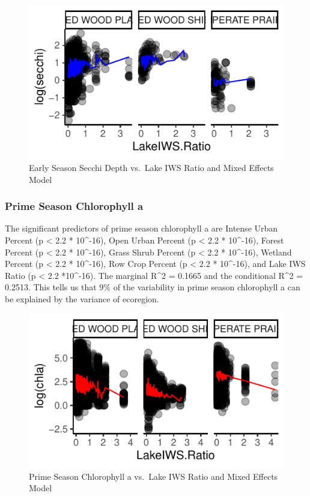 \documentclass[12pt,]{article}
\begin{document}
\begin{figure}
\centering
\includegraphics{Bollt_Greif_Raby_Roth_Project_Final_files/figure-latex/unnamed-chunk-18-1.pdf}
\caption{Early Season Secchi Depth vs.~Lake IWS Ratio and Mixed Effects
Model}
\end{figure}

\hypertarget{prime-season-chlorophyll-a}{%
\subsubsection{Prime Season Chlorophyll
a}\label{prime-season-chlorophyll-a}}

The significant predictors of prime season chlorophyll a are Intense
Urban Percent (p \textless{} 2.2 * 10\^{}-16), Open Urban Percent (p
\textless{} 2.2 * 10\^{}-16), Forest Percent (p \textless{} 2.2 *
10\^{}-16), Grass Shrub Percent (p \textless{} 2.2 * 10\^{}-16), Wetland
Percent (p \textless{} 2.2 * 10\^{}-16), Row Crop Percent (p \textless{}
2.2 * 10\^{}-16), and Lake IWS Ratio (p \textless{} 2.2 *10\^{}-16). The
marginal R\^{}2 = 0.1665 and the conditional R\^{}2 = 0.2513. This tells
us that 9\% of the variability in prime season chlorophyll a can be
explained by the variance of ecoregion.

\begin{figure}
\centering
\includegraphics{Bollt_Greif_Raby_Roth_Project_Final_files/figure-latex/unnamed-chunk-19-1.pdf}
\caption{Prime Season Chlorophyll a vs.~Lake IWS Ratio and Mixed Effects
Model}
\end{figure}
\end{document}
